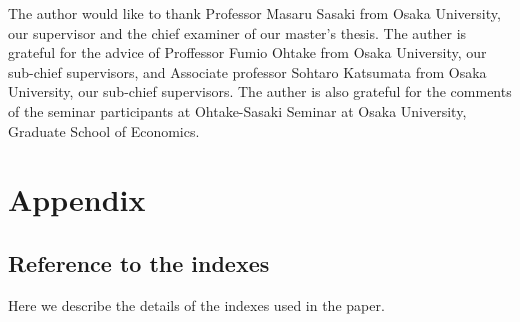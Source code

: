 \documentclass[dvipdfmx, 12pt]{article}
\begin{document}
The author would like to thank Professor Masaru Sasaki from Osaka University, our supervisor and the chief examiner of our master's thesis. The auther is grateful for the advice of Proffessor Fumio Ohtake from Osaka University, our sub-chief supervisors, and Associate professor Sohtaro Katsumata from Osaka University, our sub-chief supervisors. The auther is also grateful for the comments of the seminar participants at Ohtake-Sasaki Seminar at Osaka University, Graduate School of Economics.

\section*{Appendix}

\subsection*{Reference to the indexes}
\small

Here we describe the details of the indexes used in the paper.
\end{document}
